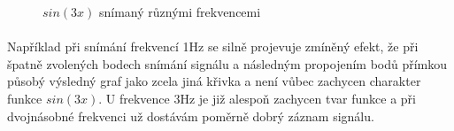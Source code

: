 \documentclass[a4paper,11pt]{article}
\begin{document}
    \begin{figure}[H]
        \centering
        \caption{$sin(3x)$ snímaný různými frekvencemi}
    \end{figure}

    \paragraph{} Například při snímání frekvencí 1Hz se silně projevuje zmíněný efekt, že při špatně zvolených
    bodech snímání signálu a následným propojením bodů přímkou působý výsledný graf jako
    zcela jiná křivka a není vůbec zachycen charakter funkce $sin(3x)$. U frekvence 3Hz je již 
    alespoň zachycen tvar funkce a při dvojnásobné frekvenci už dostávám poměrně dobrý 
    záznam signálu.
\end{document}
